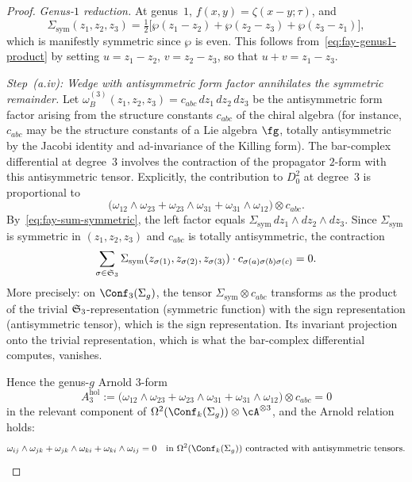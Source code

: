 \begin{proof}
\smallskip\noindent
\emph{Genus-$1$ reduction.}
At genus~$1$, $f(x,y) = \zeta(x - y; \tau)$, and
\[
 \Sigma_{\mathrm{sym}}(z_1, z_2, z_3)
 = \tfrac{1}{2}\bigl[\wp(z_1 - z_2)
 + \wp(z_2 - z_3)
 + \wp(z_3 - z_1)\bigr],
\]
which is manifestly symmetric since $\wp$ is even. This
follows from~\eqref{eq:fay-genus1-product} by setting
$u = z_1 - z_2$, $v = z_2 - z_3$, so that
$u + v = z_1 - z_3$.

\medskip
\emph{Step~(a.iv): Wedge with antisymmetric form factor annihilates
the symmetric remainder.}
Let $\omega_B^{(3)}(z_1, z_2, z_3) = c_{abc}\, dz_1\, dz_2\, dz_3$
be the antisymmetric form factor arising from the structure constants
$c_{abc}$ of the chiral algebra (for instance, $c_{abc}$ may be the
structure constants of a Lie algebra $\fg$, totally antisymmetric
by the Jacobi identity and ad-invariance of the Killing form).
The bar-complex differential at degree~$3$ involves the
contraction of the propagator $2$-form with this antisymmetric
tensor. Explicitly, the contribution to $D_0^2$ at degree~$3$
is proportional to
\[
 \bigl(\omega_{12} \wedge \omega_{23}
 + \omega_{23} \wedge \omega_{31}
 + \omega_{31} \wedge \omega_{12}\bigr)
 \otimes c_{abc}.
\]
By~\eqref{eq:fay-sum-symmetric}, the left factor equals
$\Sigma_{\mathrm{sym}}\, dz_1 \wedge dz_2 \wedge dz_3$.
Since $\Sigma_{\mathrm{sym}}$ is symmetric in $(z_1, z_2, z_3)$
and $c_{abc}$ is totally antisymmetric, the contraction
\[
 \sum_{\sigma \in \mathfrak{S}_3}
 \Sigma_{\mathrm{sym}}(z_{\sigma(1)}, z_{\sigma(2)}, z_{\sigma(3)})
 \cdot c_{\sigma(a)\sigma(b)\sigma(c)} = 0.
\]
More precisely: on $\Conf_3(\Sigma_g)$, the tensor
$\Sigma_{\mathrm{sym}} \otimes c_{abc}$ transforms as the
product of the trivial $\mathfrak{S}_3$-representation (symmetric
function) with the sign representation (antisymmetric tensor),
which is the sign representation. Its invariant projection
onto the trivial representation, which is what the
bar-complex differential computes, vanishes.

Hence the genus-$g$ Arnold $3$-form
\[
 A_3^{\mathrm{hol}}
 := \bigl(\omega_{12} \wedge \omega_{23}
 + \omega_{23} \wedge \omega_{31}
 + \omega_{31} \wedge \omega_{12}\bigr) \otimes c_{abc}
 = 0
\]
in the relevant component of $\Omega^2(\Conf_k(\Sigma_g))
\otimes \cA^{\otimes 3}$, and the Arnold relation holds:
\begin{equation}\label{eq:genus-g-arnold}
 \omega_{ij} \wedge \omega_{jk}
 + \omega_{jk} \wedge \omega_{ki}
 + \omega_{ki} \wedge \omega_{ij} = 0
 \quad \text{in } \Omega^2(\Conf_k(\Sigma_g))
 \text{ contracted with antisymmetric tensors.}
\end{equation}


\end{proof}
